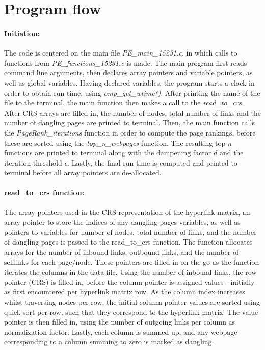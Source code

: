 \documentclass[%
oneside,                 %
final,                   %
10pt]{article}
\begin{document}
\section{Program flow}
\paragraph{Initiation:}
The code is centered on the main file \textit{PE\_main\_15231.c}, in which calls to functions from \textit{PE\_functions\_15231.c} is made. The main program first reads command line arguments, then declares array pointers and variable pointers, as well as global variables. Having declared variables, the program starts a clock in order to obtain run time, using \textit{omp\_get\_wtime()}. After printing the name of the file to the terminal, the main function then makes a call to the \textit{read\_to\_crs}. After CRS arrays are filled in, the number of nodes, total number of links and the number of dangling pages are printed to terminal. Then, the main function calls the \textit{PageRank\_iterations} function in order to compute the page rankings, before these are sorted using the \textit{top\_n\_webpages} function. The resulting top $n$ functions are printed to terminal along with the dampening factor $d$ and the iteration threshold $\epsilon$. Lastly, the final run time is computed and printed to terminal before all array pointers are de-allocated.
\paragraph{read\_to\_crs function: } The array pointers used in the CRS representation of the hyperlink matrix, an array pointer to store the indices of any dangling pages variables, as well as pointers to variables for number of nodes, total number of links, and the number of dangling pages is passed to the read\_to\_crs function. The function allocates arrays for the number of inbound links, outbound links, and the number of selflinks for each page/node. These pointers are filled in on the go as the function iterates the columns in the data file. Using the number of inbound links, the row pointer (CRS) is filled in, before the column pointer is assigned values - initially as first encountered per hyperlink matrix row. As the column index increases whilst traversing nodes per row, the initial column pointer values are sorted using quick sort per row, such that they correspond to the hyperlink matrix. The value pointer is then filled in, using the number of outgoing links per column as normalization factor. Lastly, each column is summed up, and any webpage corresponding to a column summing to zero is marked as dangling.
\end{document}
